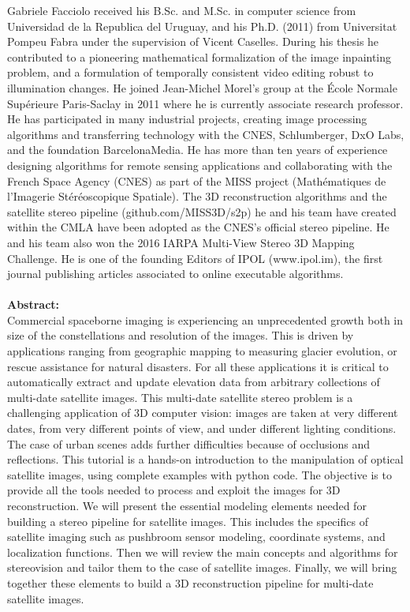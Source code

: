 \begin{wrapfloat}{figure}{o}{0pt}
  \texttt{[image: \{images/speakers/gabriele.facciolo@cmla.ens-cachan.fr]}.jpg}
\end{wrapfloat}

Gabriele Facciolo received his B.Sc. and M.Sc. in computer science from Universidad de la Republica del Uruguay, and his Ph.D. (2011) from Universitat Pompeu Fabra under the supervision of Vicent Caselles. During his thesis he contributed to a pioneering mathematical formalization of the image inpainting problem, and a formulation of temporally consistent video editing robust to illumination changes. He joined Jean-Michel Morel’s group at the École Normale Supérieure Paris-Saclay in 2011 where he is currently associate research professor. He has participated in many industrial projects, creating image processing algorithms and transferring technology with the CNES, Schlumberger, DxO Labs, and the foundation BarcelonaMedia. He has more than ten years of experience designing algorithms for remote sensing applications and collaborating with the French Space Agency (CNES) as part of the MISS project (Mathématiques de l'Imagerie Stéréoscopique Spatiale). The 3D reconstruction algorithms and the satellite stereo pipeline (github.com/MISS3D/s2p) he and his team have created within the CMLA have been adopted as the CNES’s official stereo pipeline. He and his team also won the 2016 IARPA Multi-View Stereo 3D Mapping Challenge. He is one of the founding Editors of IPOL (www.ipol.im), the first journal publishing articles associated to online executable algorithms.  
\\\\

\textbf{Abstract:}\\

Commercial spaceborne imaging is experiencing an unprecedented growth both in size of the constellations and resolution of the images. This is driven by applications ranging from geographic mapping to measuring glacier evolution, or rescue assistance for natural disasters. For all these applications it is critical to automatically extract and update elevation data from arbitrary collections of multi-date satellite images. This multi-date satellite stereo problem is a challenging application of 3D computer vision: images are taken at very different dates, from very different points of view, and under different lighting conditions. The case of urban scenes adds further difficulties because of occlusions and reflections. 
This tutorial is a hands-on introduction to the manipulation of optical satellite images, using complete examples with python code. The objective is to provide all the tools needed to process and exploit the images for 3D reconstruction. We will present the essential modeling elements needed for building a stereo pipeline for satellite images. This includes the specifics of satellite imaging such as pushbroom sensor modeling, coordinate systems, and localization functions. Then we will review the main concepts and algorithms for stereovision and tailor them to the case of satellite images. Finally, we will bring together these elements to build a 3D reconstruction pipeline for multi-date satellite images.  

